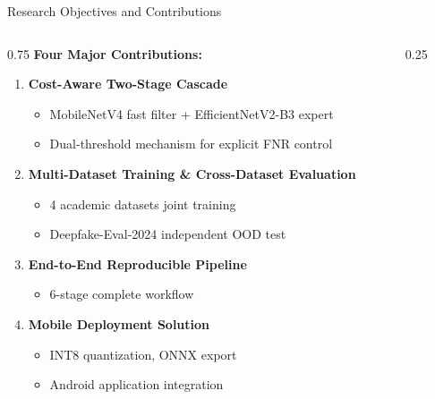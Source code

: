 \documentclass[aspectratio=169,12pt]{beamer}
\newcommand{\highlight}[1]{\textcolor{primaryblue}{\textbf{#1}}}
\begin{document}
\begin{frame}{Research Objectives and Contributions}
\begin{columns}[T]
\begin{column}{0.75\textwidth}
\textbf{Four Major Contributions:}

\begin{enumerate}
    \item \highlight{Cost-Aware Two-Stage Cascade}
    \begin{itemize}
        \item MobileNetV4 fast filter + EfficientNetV2-B3 expert
        \item Dual-threshold mechanism for explicit FNR control
    \end{itemize}

    \item \highlight{Multi-Dataset Training \& Cross-Dataset Evaluation}
    \begin{itemize}
        \item 4 academic datasets joint training
        \item Deepfake-Eval-2024 independent OOD test
    \end{itemize}

    \item \highlight{End-to-End Reproducible Pipeline}
    \begin{itemize}
        \item 6-stage complete workflow
    \end{itemize}

    \item \highlight{Mobile Deployment Solution}
    \begin{itemize}
        \item INT8 quantization, ONNX export
        \item Android application integration
    \end{itemize}
\end{enumerate}
\end{column}

\begin{column}{0.25\textwidth}
\end{column}
\end{columns}
\end{frame}
\end{document}
